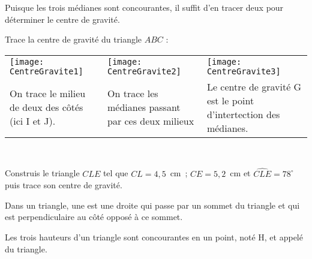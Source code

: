 \vspace{2em}

\begin{methode*1}

\begin{remarque}
Puisque les trois médianes sont concourantes, il suffit d'en tracer deux pour déterminer le centre de gravité.
 \end{remarque}

 \begin{exemple*1}
 Trace la centre de gravité du triangle $ABC$ :
 \begin{tabularx}{\textwidth}{X|X|X}
 \texttt{[image: CentreGravite1]} &  \texttt{[image: CentreGravite2]} & \texttt{[image: CentreGravite3]} \\ 
 On trace le milieu de deux des côtés (ici I et J). & On trace les médianes passant par ces deux milieux & Le centre de gravité G est le point d'intertection des médianes. \\
\end{tabularx} \\

\end{exemple*1}

 
\exercice
Construis le triangle $CLE$ tel que 
$CL = 4,5$ cm ; $CE = 5,2$ cm et $\widehat{CLE} = 78^\circ$ puis trace son centre de gravité.


\end{methode*1}



\newpage

\begin{definition}
Dans un triangle, une  est une droite qui passe par un sommet du triangle et qui est perpendiculaire au côté opposé à ce sommet.

Les trois hauteurs d'un triangle sont concourantes en un point, noté H, et appelé  du triangle.
\end{definition}

\vspace{2em}

